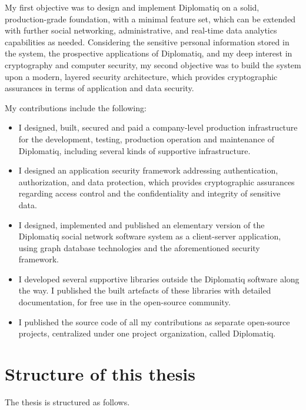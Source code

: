 My first objective was to design and implement Diplomatiq on a solid, production-grade foundation, with a minimal feature set, which can be extended with further social networking, administrative, and real-time data analytics capabilities as needed. Considering the sensitive personal information stored in the system, the prospective applications of Diplomatiq, and my deep interest in cryptography and computer security, my second objective was to build the system upon a modern, layered security architecture, which provides cryptographic assurances in terms of application and data security.

My contributions include the following:

\begin{itemize}
\item I designed, built, secured and paid a company-level production infrastructure for the development, testing, production operation and maintenance of Diplomatiq, including several kinds of supportive infrastructure.
\item I designed an application security framework addressing authentication, authorization, and data protection, which provides cryptographic assurances regarding access control and the confidentiality and integrity of sensitive data.
\item I designed, implemented and published an elementary version of the Diplomatiq social network software system as a client-server application, using graph database technologies and the aforementioned security framework.
\item I developed several supportive libraries outside the Diplomatiq software along the way. I published the built artefacts of these libraries with detailed documentation, for free use in the open-source community.
\item I published the source code of all my contributions as separate open-source projects, centralized under one project organization, called Diplomatiq.
\end{itemize}

\section{Structure of this thesis}

The thesis is structured as follows.

